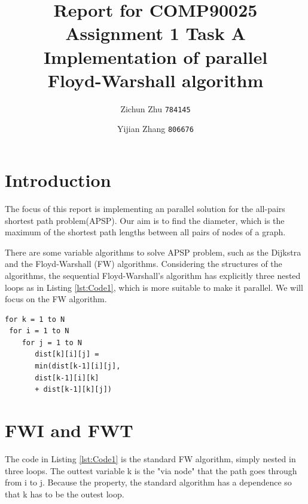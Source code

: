 \documentclass[10pt]{article}
\title{Report for COMP90025 Assignment 1 Task A \\
\large Implementation of parallel \\
Floyd-Warshall algorithm}
\author{Zichun Zhu \texttt{784145} \and Yijian Zhang \texttt{806676}}
\begin{document}
\maketitle

\section{Introduction}
The focus of this report is implementing an parallel solution for the all-pairs shortest path problem(APSP). Our aim is to find the diameter, which is the maximum of the shortest path lengths between all pairs of nodes of a graph.

There are some variable algorithms to solve APSP problem, such as the Dijkstra and the Floyd-Warshall (FW) algorithms\cite{albalawi2013task}. Considering the structures of the algorithms, the sequential Floyd-Warshall's algorithm has explicitly three nested loops as in Listing \ref{lst:Code1}, which is more suitable to make it parallel. We will focus on the FW algorithm.

\begin{lstlisting}[label={lst:Code1},caption={Sequantial standard FW algorithm.}, captionpos=b,basicstyle=\small]
for k = 1 to N
 for i = 1 to N
    for j = 1 to N
       dist[k][i][j] =
       min(dist[k-1][i][j],
       dist[k-1][i][k]
       + dist[k-1][k][j])
\end{lstlisting}

\section{FWI and FWT}
The code in Listing \ref{lst:Code1} is the standard FW algorithm, simply nested in three loops. The outtest variable k is the "via node" that the path goes through from i to j. Because the property, the standard algorithm has a dependence so that k has to be the outest loop.
\end{document}
